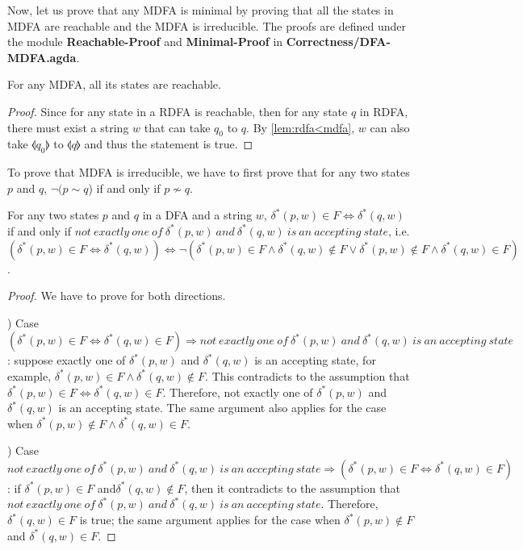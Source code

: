\par Now, let us prove that any MDFA is minimal by proving that all the states in MDFA are reachable and the MDFA
is irreducible. The proofs are defined under the module
\textbf{Reachable-Proof} and \textbf{Minimal-Proof} in
\textbf{Correctness/DFA-MDFA.agda}. 

\begin{thm}
\label{thm:all_reach}
\noindent For any MDFA, all its states are reachable. 
\end{thm}

\begin{proof}
\noindent Since for any state in a RDFA is reachable, then for any
state \(q\) in RDFA, there must
exist a string \(w\) that can take \(q_0\) to \(q\). By
\autoref{lem:rdfa<mdfa}, \(w\) can also take \(\llangle q_0
\rrangle\) to \(\llangle q \rrangle\) and thus the statement is true. 
\end{proof}

\par To prove that MDFA is irreducible, we have to first prove
that for any two states \(p\) and \(q\), \(\neg (p \sim q\)) if and only if
\(p \nsim q\). 

\begin{lem}
\label{lem:sim_nsim1}
\noindent For any two states \(p\) and \(q\) in a DFA and a string
\(w\), \(\delta^*(p,w) \in F \Leftrightarrow \delta^*(q,w)\) if and
only if \(not\ exactly\ one\ of\ \delta^*(p,w)\ and\ \delta^*(q,w)\
is\ an\ accepting\ state\), i.e. \((\delta^*(p,w) \in F \Leftrightarrow
\delta^*(q,w)) \Leftrightarrow \neg (\delta^*(p,w) \in F \wedge \delta^*(q,w) \notin F \vee
\delta^*(p,w) \notin F \wedge \delta^*(q,w) \in F)\). 
\end{lem}

\begin{proof}
\noindent We have to prove for both directions. 

\par {}) Case \((\delta^*(p,w) \in F \Leftrightarrow
\delta^*(q,w) \in F) \Rightarrow not\ 
exactly\ one\ of\ \delta^*(p,w)\ and\ \delta^*(q,w)\ is\ 
an\ accepting\ state\): suppose exactly one of \(\delta^*(p,w)\) and
\(\delta^*(q,w)\) is an accepting state, for example, \(\delta^*(p,w)
\in F \wedge \delta^*(q,w) \notin F\). This contradicts to the
assumption that \(\delta^*(p,w) \in F \Leftrightarrow \delta^*(q,w) \in F\). Therefore, not
exactly one of \(\delta^*(p,w)\) and \(\delta^*(q,w)\) is
an accepting state. The same argument also applies for the case when \(\delta^*(p,w)
\notin F \wedge \delta^*(q,w) \in F\).

\par \noindent 2) Case \(not\ 
exactly\ one\ of\ \delta^*(p,w)\ and\ \delta^*(q,w)\ is\ 
an\ accepting\ state \Rightarrow (\delta^*(p,w) \in F \Leftrightarrow
\delta^*(q,w) \in F)\): if \(\delta^*(p,w) \in F\) and\(\delta^*(q,w) \notin
F\), then it contradicts to the assumption that \(not\ 
exactly\ one\ of\ \delta^*(p,w)\ and\ \delta^*(q,w)\ is\ 
an\ accepting\ state\). Therefore, \(\delta^*(q,w) \in F\) is true;
the same argument applies for the case when \(\delta^*(p,w) \notin F\)
and \(\delta^*(q,w) \in F\).
\end{proof}


